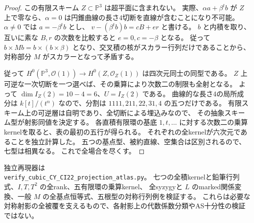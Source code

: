 \begin{proof}
この有限スキーム $Z\subset\mathbb P^3$ は超平面に含まれない。
実際、$\alpha a+\beta^tb$ が $Z$ 上で零なら、$\alpha=0$ は円錐曲線の長さ4切断を直線が含むことになり不可能。
$\alpha\ne0$ では $a=-\beta^tb$ とし、
$v-(\beta^tb)b=cB+er$ と書ける。
$b$ と内積を取り、互いに素な $B,r$ の次数を比較すると $e=0,c=-\beta$ となる。
従って $b\times Mb=b\times(b\times\beta)$ となり、交叉積の核がスカラー行列だけであることから、
対称部分 $M$ がスカラーとなって矛盾する。

従って $H^0(\mathbb P^3,\mathcal O(1))\to H^0(Z,\mathcal O_Z(1))$ は四次元同士の同型である。
$Z$ 上可逆な一次切断を一つ選べば、その乗算により次数二の制限も全射となる。
よって $\dim I_Z(2)=10-4=6$、$U=I_Z(2)$ である。
曲線的な長さ4の局所成分は $k[t]/(t^n)$ なので、分割は
$1111,211,22,31,4$ の五つだけである。
有限スキーム上の可逆層は自明であり、全切断による埋込みなので、
その抽象スキーム型が射影同値を決定する。
各直積有限環の基底 $1,t,\ldots$ に対する次数二の乗算kernelを取ると、表の最初の五行が得られる。
それぞれの全kernelが六次元であることを独立計算した。
五つの基点型、被約直線、空集合は区別されるので、七型は相異なる。
これで全場合を尽くす。
\end{proof}

独立再現器は\\
\texttt{verify\_cubic\_CY\_CI22\_projection\_atlas.py}。
七つの全積kernelと鉛筆行列式、$I,T,T^2$ の全rank、五有限環の乗算kernel、
全syzygyと $L$ のmarked関係変換、一般 $M$ の全基点恒等式、五根型の対称行列例を検証する。
これらは必要な対称射影の全被覆を支えるもので、各射影上の代数係数分類やAS十分性の検証ではない。
